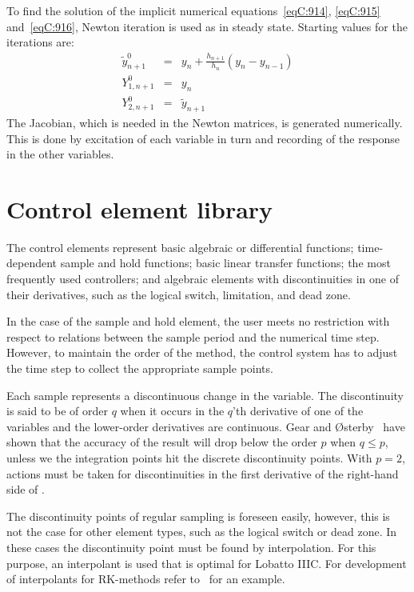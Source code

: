 %
To find the solution of the implicit numerical equations~\eqref{eqC:914},
\eqref{eqC:915} and~\eqref{eqC:916}, Newton iteration is used as in steady state.
Starting values for the iterations are:
%
\begin{eqnarray}
\tilde{y}_{n+1}^0 &=& y_n + \frac{h_{n+1}}{h_n} \left(y_n - y_{n-1}\right)
\label{eqC:919} \\
%
Y_{1,n+1}^0 &=& y_n
\label{eqC:920} \\
%
Y_{2,n+1}^0 &=& \tilde{y}_{n+1}
\label{eqC:921}
\end{eqnarray}
%
The Jacobian, which is needed in the Newton matrices, is generated numerically.
This is done by excitation of each variable in turn and recording of the
response in the other variables.

\section{Control element library}

The control elements represent basic algebraic or differential functions;
time- dependent sample and hold functions; basic linear transfer functions;
the most frequently used controllers; and algebraic elements with
discontinuities in one of their derivatives, such as the logical switch,
limitation, and dead zone.

In the case of the sample and hold element, the user meets no restriction with
respect to relations between the sample period and the numerical time step.
However, to maintain the order of the method, the control system has to adjust
the time step to collect the appropriate sample points.

Each sample represents a discontinuous change in the variable.
The discontinuity is said to be of order $q$ when it occurs in the $q$'th
derivative of one of the variables and the lower-order derivatives are continuous.
Gear and {\O}sterby~\cite{GearOsterby} have shown that the accuracy of the
result will drop below the order $p$ when $q \le p$, unless we the integration
points hit the discrete discontinuity points.
With $p = 2$, actions must be taken for discontinuities in the first derivative
of the right-hand side of .

The discontinuity points of regular sampling is foreseen easily, however, this is
not the case for other element types, such as the logical switch or dead zone.
In these cases the discontinuity point must be found by interpolation.
For this purpose, an interpolant is used that is optimal for Lobatto IIIC.
For development of interpolants for RK-methods refer to~\cite{RungeKutta}
for an example.

